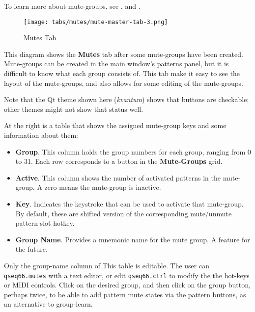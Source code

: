    To learn more about mute-groups, see
   , and
   .

\begin{figure}[H]
   \centering 
   \texttt{[image: tabs/mutes/mute-master-tab-3.png]}
   \caption{Mutes Tab}
   \label{fig:mutes_master_tab}
\end{figure}

   This diagram shows the \textbf{Mutes} tab after some mute-groups have been
   created.  Mute-groups can be created in the main window's patterns panel,
   but it is difficult to know what each group consists of.  This tab make it
   easy to see the layout of the mute-groups, and also allows for some editing
   of the mute-groups.

   Note that the Qt theme shown here (\textsl{kvantum})
   shows that buttons are checkable; other themes might not show that status
   well.

   \setcounter{ItemCounter}{0}      %

   At the right is a table that shows the assigned mute-group keys and
   some information about them:

      \begin{itemize}
         \item \textbf{Group}.
            This column holds the group numbers for each group, ranging from 0
            to 31.  Each row corresponds to a button in the
            \textbf{Mute-Groups} grid.
         \item \textbf{Active}.
            This column shows the number of activated patterns in the
            mute-group.  A zero means the mute-group is inactive.
         \item \textbf{Key}.
            Indicates the keystroke that can be used to activate that
            mute-group.
            By default, these are shifted version of the corresponding
            mute/unmute pattern-slot hotkey.
         \item \textbf{Group Name}.
            Provides a mnemonic name for the mute group.  A feature for the
            future.
      \end{itemize}

   Only the group-name column of This table is editable.
   The user can \texttt{qseq66.mutes} with a text editor, or
   edit \texttt{qseq66.ctrl} to modify the the hot-keys or MIDI
   controls.
   Click on the desired group, and then click on the group button, perhaps
   twice, to be able to add pattern mute states via the pattern buttons,
   as an alternative to group-learn.

